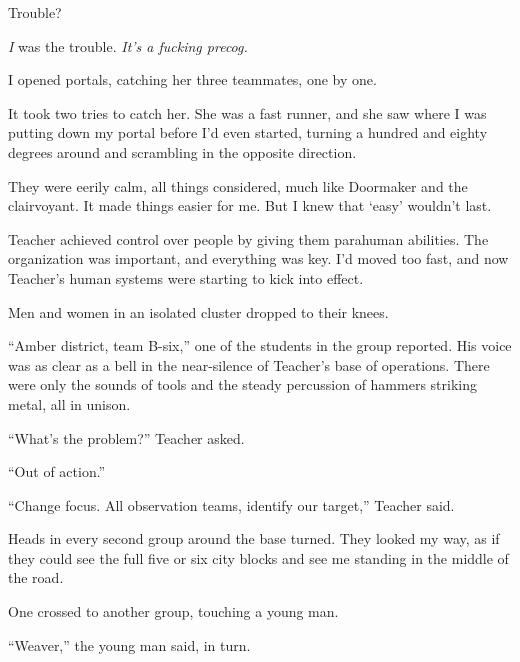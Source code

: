 Trouble?



\emph{I }was the trouble.  \emph{It's a fucking precog.}



I opened portals, catching her three teammates, one by one.



It took two tries to catch her.  She was a fast runner, and she saw where I was putting down my portal before I'd even started, turning a hundred and eighty degrees around and scrambling in the opposite direction.



They were eerily calm, all things considered, much like Doormaker and the clairvoyant.  It made things easier for me.  But I knew that `easy' wouldn't last.



Teacher achieved control over people by giving them parahuman abilities.  The organization was important, and everything was key.  I'd moved too fast, and now Teacher's human systems were starting to kick into effect.



Men and women in an isolated cluster dropped to their knees.



``Amber district, team B-six,'' one of the students in the group reported.  His voice was as clear as a bell in the near-silence of Teacher's base of operations.  There were only the sounds of tools and the steady percussion of hammers striking metal, all in unison.



``What's the problem?''  Teacher asked.



``Out of action.''



``Change focus.  All observation teams, identify our target,'' Teacher said.



Heads in every second group around the base turned.  They looked my way, as if they could see the full five or six city blocks and see me standing in the middle of the road.



One crossed to another group, touching a young man.



``Weaver,'' the young man said, in turn.



